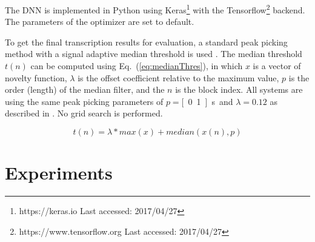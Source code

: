 \documentclass{article}
\begin{document}
The DNN is implemented in Python using Keras\footnote{https://keras.io Last accessed: 2017/04/27} with the Tensorflow\footnote{https://www.tensorflow.org Last accessed: 2017/04/27} backend. The parameters of the optimizer are set to default. 

To get the final transcription results for evaluation, a standard peak picking method with a signal adaptive median threshold is used \cite{Lerch2012}. The median threshold $t(n)$ can be computed using Eq.~(\ref{eq:medianThres}), in which $x$ is a vector of novelty function, $\lambda$ is the offset coefficient relative to the maximum value, $p$ is the order (length) of the median filter, and the $n$ is the block index. All systems are using the same peak picking parameters of $p = $\unit[0.1]{s} and $\lambda = 0.12$ as described in \cite{Wu2015a}. No grid search is performed.  

\begin{equation}\label{eq:medianThres}
t(n) = \lambda * max(x) + median(x(n), p)
\end{equation} 

\section{Experiments}\label{sec:experiments}
\end{document}
